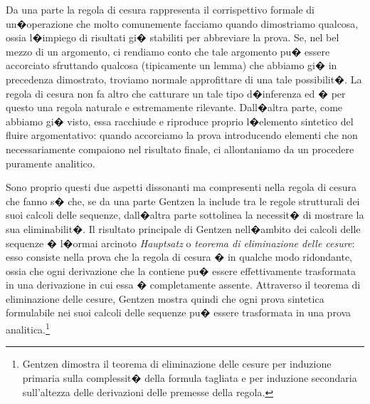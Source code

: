 \documentclass[a4paper,12pt]{aphex}
\begin{document}
 Da una parte la regola di cesura rappresenta il corrispettivo formale di un�operazione che molto comunemente facciamo quando dimostriamo qualcosa, ossia l�impiego di risultati gi� stabiliti per abbreviare la prova. Se, nel bel mezzo di un argomento, ci rendiamo conto che tale argomento pu� essere accorciato sfruttando qualcosa (tipicamente un lemma) che abbiamo gi� in precedenza dimostrato, troviamo normale approfittare di una tale possibilit�. La regola di cesura non fa altro che catturare un tale tipo d�inferenza ed � per questo una regola naturale e estremamente rilevante. Dall�altra parte, come abbiamo gi� visto, essa racchiude e riproduce proprio l�elemento sintetico del fluire argomentativo: quando accorciamo la prova  introducendo elementi che non necessariamente compaiono nel risultato finale,  ci  allontaniamo da un procedere puramente analitico. 
 
Sono proprio questi due aspetti dissonanti ma compresenti nella regola di cesura che fanno s� che, se da una parte Gentzen la include tra le regole strutturali dei suoi calcoli delle sequenze, dall�altra parte sottolinea la necessit� di mostrare la sua eliminabilit�. Il risultato principale di Gentzen nell�ambito dei calcoli delle sequenze � l�ormai arcinoto \emph{Hauptsatz} o \emph{teorema di eliminazione delle cesure}: esso consiste nella prova che la regola di cesura � in qualche modo ridondante, ossia che ogni derivazione che la contiene pu�  essere effettivamente trasformata in una derivazione in cui essa � completamente assente. Attraverso il teorema di eliminazione delle cesure, Gentzen mostra quindi che ogni prova sintetica  formulabile nei suoi calcoli delle sequenze pu� essere trasformata in una prova analitica.\footnote{Gentzen dimostra il teorema di eliminazione delle cesure per induzione primaria sulla complessit� della formula tagliata e per induzione secondaria sull'altezza delle derivazioni delle premesse della regola.}
\end{document}
